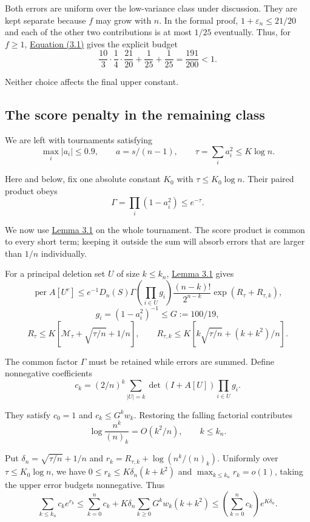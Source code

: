 \documentclass[11pt,a4paper]{article}
\newcommand{\paperref}[2]{\hyperref[#1]{#2}}
\begin{document}
Both errors are uniform over the low-variance class under discussion. They are kept separate because \(f\) may grow with \(n\). In the formal proof, \(1+\varepsilon_n\le21/20\) and each of the other two contributions is at most \(1/25\) eventually. Thus, for \(f\ge1\), \paperref{eq-exceptional-bound}{Equation (3.1)} gives the explicit budget
\[\frac{10}{3}\cdot\frac14\cdot\frac{21}{20}+\frac1{25}+\frac1{25}
=\frac{191}{200}<1.\]

Neither choice affects the final upper constant.

\subsection{The score penalty in the remaining class}\label{sec-3.4}

We are left with tournaments satisfying
\[\max_i|a_i|\le0.9,\qquad
a=s/(n-1),\qquad \tau=\sum_i a_i^2\le K\log n.\]

Here and below, fix one absolute constant \(K_0\) with \(\tau\le K_0\log n\). Their paired product obeys
\[\Gamma=\prod_i(1-a_i^2)\le e^{-\tau}.\]

We now use \paperref{thm-3.1}{Lemma 3.1} on the whole tournament. The score product is common to every short term; keeping it outside the sum will absorb errors that are larger than \(1/n\) individually.

For a principal deletion set \(U\) of size \(k\le k_n\), \paperref{thm-3.1}{Lemma 3.1} gives
\[\operatorname{per}A[U^c]\le
e^{-1}D_n(S)\Gamma
\left(\prod_{i\in U}g_i\right)
\frac{(n-k)!}{2^{n-k}}\exp(R_\tau+R_{\tau,k}),\]
\nopagebreak[3]\[g_i=(1-a_i^2)^{-1}\le G:=100/19,\]
\nopagebreak[3]\[R_\tau\le K[\mathcal M_\tau+\sqrt{\tau/n}+1/n],\qquad
R_{\tau,k}\le K[k\sqrt{\tau/n}+(k+k^2)/n].\]

The common factor \(\Gamma\) must be retained while errors are summed. Define nonnegative coefficients
\[c_k=(2/n)^k\sum_{|U|=k}\det(I+A[U])\prod_{i\in U}g_i.\]

They satisfy \(c_0=1\) and \(c_k\le G^kw_k\). Restoring the falling factorial contributes
\[\log\frac{n^k}{(n)_k}=O(k^2/n),\qquad k\le k_n.\]

Put \(\delta_n=\sqrt{\tau/n}+1/n\) and \(r_k=R_{\tau,k}+\log(n^k/(n)_k)\). Uniformly over \(\tau\le K_0\log n\), we have \(0\le r_k\le K\delta_n(k+k^2)\) and \(\max_{k\le k_n}r_k=o(1)\), taking the upper error budgets nonnegative. Thus
\[\sum_{k\le k_n}c_ke^{r_k}
\le\sum_{k=0}^{n}c_k+
K\delta_n\sum_{k\ge0}G^kw_k(k+k^2)
\le\left(\sum_{k=0}^{n}c_k\right)e^{K\delta_n}.\]
\end{document}

